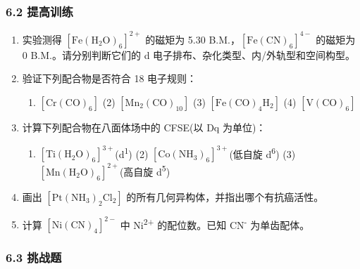 \subsubsection{6.2 提高训练}\label{ux63d0ux9ad8ux8badux7ec3}

\begin{enumerate}
\def\labelenumi{\arabic{enumi}.}
\setcounter{enumi}{4}
\item
  实验测得 \([\mathrm{Fe(H_2O)_6}]^{2+}\) 的磁矩为 5.30 B.M.，\([\mathrm{Fe(CN)_6}]^{4-}\) 的磁矩为 0 B.M.。请分别判断它们的 d 电子排布、杂化类型、内/外轨型和空间构型。
\item
  验证下列配合物是否符合 18 电子规则：

  \begin{enumerate}
  \def\labelenumii{(\arabic{enumii})}
  \tightlist
  \item
    \(\mathrm{[Cr(CO)_6]}\) (2) \(\mathrm{[Mn_2(CO)_{10}]}\) (3) \(\mathrm{[Fe(CO)_4H_2]}\) (4) \(\mathrm{[V(CO)_6]}\)
  \end{enumerate}
\item
  计算下列配合物在八面体场中的 CFSE(以 Dq 为单位)：

  \begin{enumerate}
  \def\labelenumii{(\arabic{enumii})}
  \tightlist
  \item
    \([\mathrm{Ti(H_2O)_6}]^{3+}\)(d\textsuperscript{1}) (2) \([\mathrm{Co(NH_3)_6}]^{3+}\)(低自旋 d\textsuperscript{6}) (3) \([\mathrm{Mn(H_2O)_6}]^{2+}\)(高自旋 d\textsuperscript{5})
  \end{enumerate}
\item
  画出 \([\mathrm{Pt(NH_3)_2Cl_2}]\) 的所有几何异构体，并指出哪个有抗癌活性。
\item
  计算 \([\mathrm{Ni(CN)_4}]^{2-}\) 中 Ni\textsuperscript{2+} 的配位数。已知 CN\textsuperscript{-} 为单齿配体。
\end{enumerate}

\subsubsection{6.3 挑战题}\label{ux6311ux6218ux9898}

